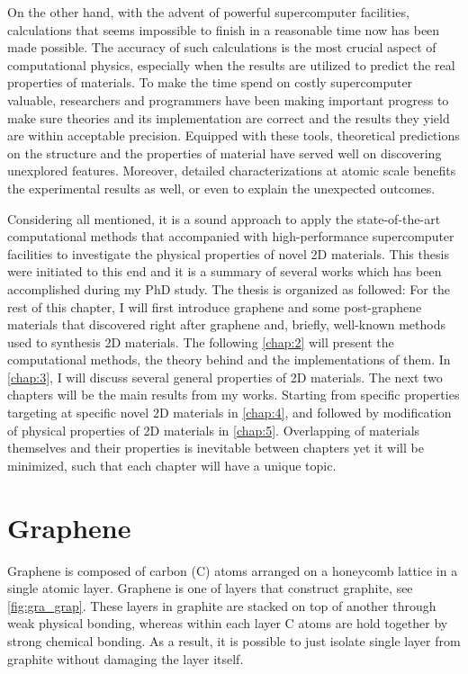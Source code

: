 On the other hand, with the advent of powerful supercomputer facilities, calculations that seems impossible to finish in a reasonable time now has been made possible. The accuracy of such calculations is the most crucial aspect of computational physics, especially when the results are utilized to predict the real properties of materials. To make the time spend on costly supercomputer valuable, researchers and programmers have been making important progress to make sure theories and its implementation are correct and the results they yield are within acceptable precision. Equipped with these tools, theoretical predictions on the structure and the properties of material have served well on discovering unexplored features. Moreover, detailed characterizations at atomic scale benefits the experimental results as well, or even to explain the unexpected outcomes.

Considering all mentioned, it is a sound approach to apply the state-of-the-art computational methods that accompanied with high-performance supercomputer facilities to investigate the physical properties of novel 2D materials. This thesis were initiated to this end and it is a summary of several works which has been accomplished during my PhD study. The thesis is organized as followed: For the rest of this chapter, I will first introduce graphene and some post-graphene materials that discovered right after graphene and, briefly, well-known methods used to synthesis 2D materials. The following \autoref{chap:2} will present the computational methods, the theory behind and the implementations of them. In \autoref{chap:3}, I will discuss several general properties of 2D materials. The next two chapters will be the main results from my works. Starting from specific properties targeting at specific novel 2D materials in \autoref{chap:4}, and followed by modification of physical properties of 2D materials in \autoref{chap:5}. Overlapping of materials themselves and their properties is inevitable between chapters yet it will be minimized, such that each chapter will have a unique topic. 


\section{Graphene}

Graphene is composed of carbon (C) atoms arranged on a honeycomb lattice in a single atomic layer. Graphene is one of layers that construct graphite, see \autoref{fig:gra_grap}. These layers in graphite are stacked on top of another through weak physical bonding, whereas within each layer C atoms are hold together by strong chemical bonding. As a result, it is possible to just isolate single layer from graphite without damaging the layer itself. 

